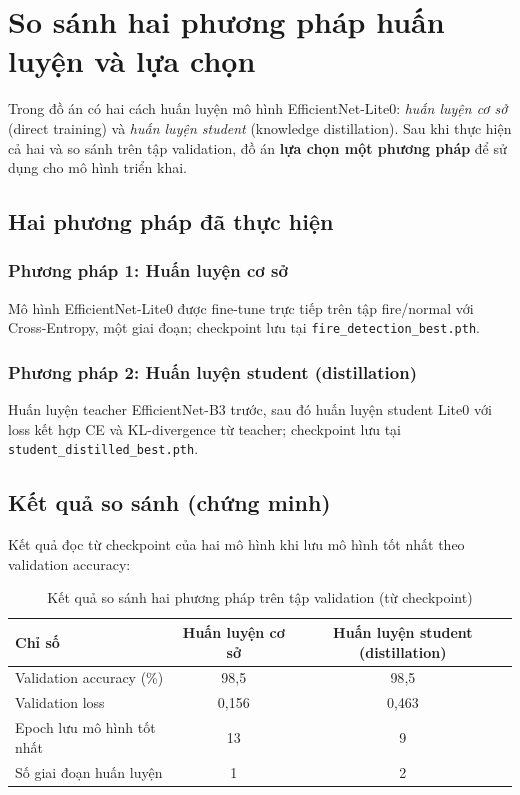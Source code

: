 \documentclass[12pt,a4paper]{report}
\begin{document}
\section{So sánh hai phương pháp huấn luyện và lựa chọn}

Trong đồ án có hai cách huấn luyện mô hình EfficientNet-Lite0: \emph{huấn luyện cơ sở} (direct training) và \emph{huấn luyện student} (knowledge distillation). Sau khi thực hiện cả hai và so sánh trên tập validation, đồ án \textbf{lựa chọn một phương pháp} để sử dụng cho mô hình triển khai.

\subsection{Hai phương pháp đã thực hiện}

\subsubsection{Phương pháp 1: Huấn luyện cơ sở}

Mô hình EfficientNet-Lite0 được fine-tune trực tiếp trên tập fire/normal với Cross-Entropy, một giai đoạn; checkpoint lưu tại \texttt{fire\_detection\_best.pth}.

\subsubsection{Phương pháp 2: Huấn luyện student (distillation)}

Huấn luyện teacher EfficientNet-B3 trước, sau đó huấn luyện student Lite0 với loss kết hợp CE và KL-divergence từ teacher; checkpoint lưu tại \texttt{student\_distilled\_best.pth}.

\subsection{Kết quả so sánh (chứng minh)}

Kết quả đọc từ checkpoint của hai mô hình khi lưu mô hình tốt nhất theo validation accuracy:

\begin{table}[h]
  \centering
  \caption{Kết quả so sánh hai phương pháp trên tập validation (từ checkpoint)}
  \begin{tabular}{lcc}
    \toprule
    Chỉ số & Huấn luyện cơ sở & Huấn luyện student (distillation) \\
    \midrule
    Validation accuracy (\%) & 98{,}5 & 98{,}5 \\
    Validation loss & 0{,}156 & 0{,}463 \\
    Epoch lưu mô hình tốt nhất & 13 & 9 \\
    Số giai đoạn huấn luyện & 1 & 2 \\
    \bottomrule
  \end{tabular}
\end{table}
\end{document}
